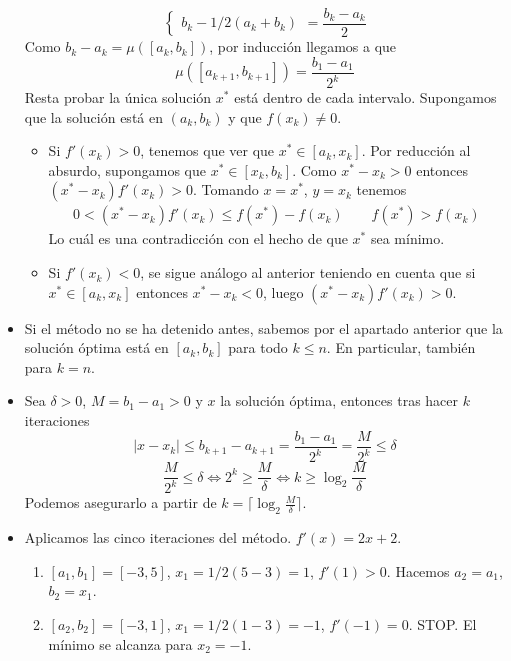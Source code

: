 \documentclass[twoside]{article}
\begin{document}
\begin{solucion}
\begin{itemize}
$$\begin{cases}
b_k - 1/2(a_k+b_k)
\end{cases} = \frac{b_k-a_k}{2}
$$
Como $b_k-a_k = \mu([a_k,b_k])$, por inducción llegamos a que
$$
\mu([a_{k+1},b_{k+1}]) = \frac{b_1-a_1}{2^k}
$$
Resta probar la única solución $x^*$ está dentro de cada intervalo. Supongamos que la solución está en $(a_k,b_k)$ y que $f(x_k)\neq0$.
\begin{itemize}
\item Si $f'(x_k)>0$, tenemos que ver que $x^*\in [a_k,x_k]$. Por reducción al absurdo, supongamos que $x^*\in [x_k,b_k]$. Como $x^*-x_k>0$ entonces $(x^*-x_k)f'(x_k)>0$. Tomando $x=x^*$, $y=x_k$ tenemos
\begin{gather*}0<(x^*-x_k)f'(x_k)\leq {f(x^*)-f(x_k)} \qquad f(x^*) > f(x_k)
\end{gather*}
Lo cuál es una contradicción con el hecho de que $x^*$ sea mínimo.
\item Si $f'(x_k)<0$, se sigue análogo al anterior teniendo en cuenta que si $x^*\in[a_k,x_k]$ entonces $x^*-x_k<0$, luego $(x^*-x_k)f'(x_k)>0$. 
\end{itemize}
\item Si el método no se ha detenido antes, sabemos por el apartado anterior que la solución óptima está en $[a_k,b_k]$ para todo $k\leq n$. En particular, también para $k=n$.
\item Sea $\delta>0$, $M=b_1-a_1>0$ y $x$ la solución óptima, entonces tras hacer $k$ iteraciones  
$$
|x-x_k|\leq b_{k+1}-a_{k+1} = \frac{b_1-a_1}{2^k}=\frac{M}{2^k}\leq\delta
$$
$$\frac{M}{2^k}\leq\delta \Leftrightarrow 2^k \geq \frac{M}{\delta} \Leftrightarrow k \geq \log_2  \frac{M}{\delta}
$$
Podemos asegurarlo a partir de $k=\lceil\log_2  \frac{M}{\delta}\rceil$.
\item Aplicamos las cinco iteraciones del método. $f'(x)=2x+2$.
\begin{enumerate} 
\item $[a_1,b_1]=[-3,5]$, $x_1 = 1/2(5-3)= 1$, $f'(1)>0$. Hacemos $a_2=a_1$, $b_2=x_1$.
\item $[a_2,b_2]=[-3,1]$, $x_1 = 1/2(1-3)= -1$, $f'(-1)=0$. STOP. El mínimo se alcanza para $x_2 =-1$.
\end{enumerate}
\end{itemize}

\end{solucion}

\newpage
\end{document}
